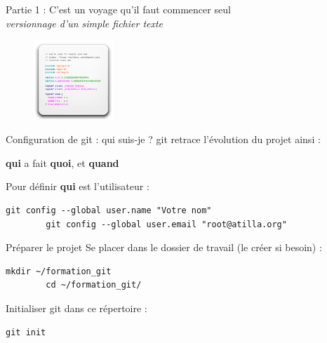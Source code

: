 \documentclass{beamer}
\begin{document}
\begin{frame}
	\begin{center}
 		\Large{Partie 1 : C'est un voyage qu'il faut commencer seul}\\
 		{\small  \textit{versionnage d'un simple fichier texte}}
	\end{center}

	\begin{figure}
		\centering
		\includegraphics[height=3cm]{img/source}
	\end{figure}
\end{frame}

\begin{frame}[fragile]{Configuration de git : qui suis-je ?}
	git retrace l'évolution du projet ainsi :
	\begin{center}
		\textbf{qui} a fait \textbf{quoi}, et \textbf{quand}
	\end{center}
	
	Pour définir \textbf{qui} est l'utilisateur :
	\begin{lstlisting}[frame=single]
		git config --global user.name "Votre nom"
		git config --global user.email "root@atilla.org"
	\end{lstlisting}

\end{frame}

\begin{frame}[fragile]{Préparer le projet}
	Se placer dans le dossier de travail (le créer si besoin) :
	\begin{lstlisting}[frame=single]
		mkdir ~/formation_git
		cd ~/formation_git/
	\end{lstlisting}
	
	Initialiser git dans ce répertoire :
	\begin{lstlisting}[frame=single]
		git init
	\end{lstlisting}
\end{frame}
\end{document}
